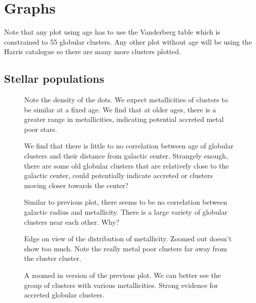 \documentclass{article}
\begin{document}
\section*{Graphs}
Note that any plot using age has to use the Vanderberg 
table which is constrained to 55 globular clusters. Any 
other plot without age will be using the Harris catalogue 
so there are many more clusters plotted.

\subsection*{Stellar populations}
\begin{figure} [H]
    \centering
    \scalebox{0.75}{}
    \caption{Note the density of the dots. We expect 
    metallicities of clusters to be similar at a fixed 
    age. We find that at older ages, there is a greater 
    range in metallicities, indicating potential accreted
    metal poor stars.}
\end{figure}

\begin{figure} [H]
    \centering
    \scalebox{0.75}{}
    \caption{We find that there is little to no correlation
    between age of globular clusters and their distance from 
    galactic center. Strangely enough, there are some old 
    globular clusters that are relatively close to the galactic
    center, could potentially indicate accreted or clusters
    moving closer towards the center?}
\end{figure}

\begin{figure} [H]
    \centering
    \scalebox{0.75}{}
    \caption{Similar to previous plot, there seems to be 
    no correlation between galactic radius and metallicity.
    There is a large variety of globular clusters near 
    each other. Why?}
\end{figure}

\begin{figure} [H]
    \centering
    \scalebox{0.75}{}
    \caption{Edge on view of the distribution of metallicity.
    Zoomed out doesn't show too much. Note the really metal 
    poor clusters far away from the cluster cluster.}
\end{figure}

\begin{figure} [H]
    \centering
    \scalebox{0.75}{}
    \caption{A zoomed in version of the previous plot. We 
    can better see the group of clusters with various 
    metallicities. Strong evidence for accreted globular
    clusters.}
\end{figure}
\end{document}
